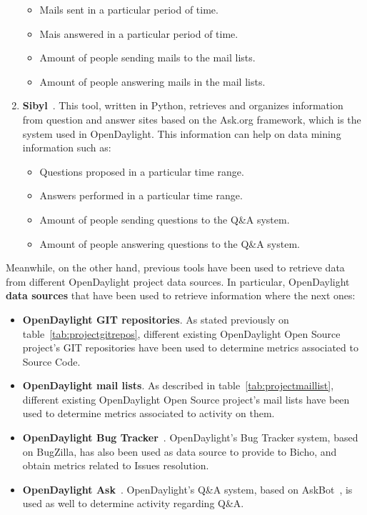 \documentclass[a4paper, 12pt]{book}
\begin{document}
\begin{enumerate}
\begin{itemize}\itemsep0pt
\item{Mails sent in a particular period of time}.
\item{Mais answered in a particular period of time}.
\item{Amount of people sending mails to the mail lists}.
\item{Amount of people answering mails in the mail lists}.
\end{itemize}
\item{\textbf{Sibyl}~\cite{Sibyl}}. This tool, written in Python, retrieves and organizes information from question and answer sites based on the Ask.org framework, which is the system used in OpenDaylight. This information can help on data mining information such as:
\begin{itemize}\itemsep0pt
\item{Questions proposed in a particular time range}.
\item{Answers performed in a particular time range}.
\item{Amount of people sending questions to the Q\&A system}.
\item{Amount of people answering questions to the Q\&A system}.
\end{itemize}
\end{enumerate}
Meanwhile, on the other hand, previous tools have been used to retrieve data from different OpenDaylight project data sources. In particular, OpenDaylight \textbf{data sources} that have been used to retrieve information where the next ones:
\begin{itemize}\itemsep0pt
\item{\textbf{OpenDaylight GIT repositories}}. As stated previously on table~\ref{tab:projectgitrepos}, different existing OpenDaylight Open Source project's GIT repositories have been used to determine metrics associated to Source Code.
\item{\textbf{OpenDaylight mail lists}}. As described in table~\ref{tab:projectmaillist}, different existing OpenDaylight Open Source project's mail lists have been used to determine metrics associated to activity on them.
\item{\textbf{OpenDaylight Bug Tracker}~\cite{OpenDaylightBugzilla}}. OpenDaylight's Bug Tracker system, based on BugZilla, has also been used as data source to provide to Bicho, and obtain metrics related to Issues resolution.
\item{\textbf{OpenDaylight Ask}~\cite{OpenDaylightAsk}}. OpenDaylight's Q\&A system, based on AskBot~\cite{AskBot}, is used as well to determine activity regarding Q\&A.
\end{itemize}
\end{document}
